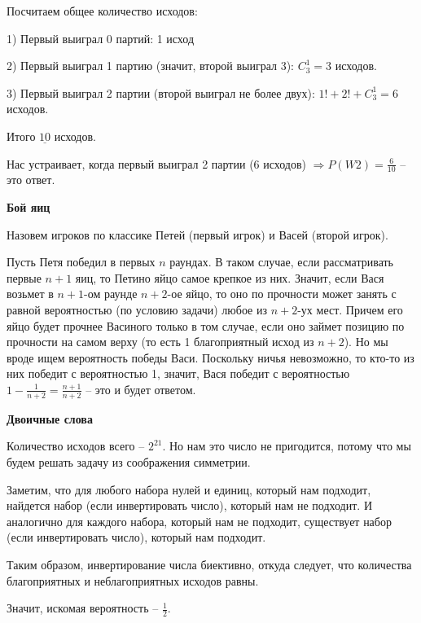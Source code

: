 \documentclass[12pt]{extreport}
\theoremstyle{definiton}
\theoremstyle{definition}
\theoremstyle{definition}
\newcounter{problem}
\newcounter{subproblem}
\def\beforPRskip{
    \bigskip
}
\def\pr{\beforPRskip\noindent\stepcounter{problem}{\bf \theproblem .\;}\setcounter{subproblem}{0}}
\begin{document}
        Посчитаем общее количество исходов:

        1) Первый выиграл 0 партий: 1 исход

        2) Первый выиграл 1 партию (значит, второй выиграл 3): $C_3^1 = 3$ исходов.

        3) Первый выиграл 2 партии (второй выиграл не более двух): $1! + 2! + C_3^1 = 6$ исходов.

        Итого $\underline{10}$ исходов.

        Нас устраивает, когда первый выиграл 2 партии (6 исходов) $\Rightarrow P(W2) = \frac{6}{10}$ -- это ответ.

    \pr \textbf{Бой яиц}

        Назовем игроков по классике Петей (первый игрок) и Васей (второй игрок).

        Пусть Петя победил в первых $n$ раундах. В таком случае, если рассматривать первые $n+1$ яиц, то Петино яйцо самое крепкое из них.
        Значит, если Вася возьмет в $n+1$-ом раунде $n+2$-ое яйцо, то оно по прочности может занять с равной вероятностью (по условию задачи)
        любое из $n+2$-ух мест. Причем его яйцо будет прочнее Васиного только в том случае, если оно займет позицию по прочности на самом верху (то есть 1 благоприятный исход из $n+2$).
        Но мы вроде ищем вероятность победы Васи. Поскольку ничья невозможно, то кто-то из них победит с вероятностью 1, значит,
        Вася победит с вероятностью $1 - \frac{1}{n+2} = \frac{n + 1}{n + 2}$ -- это и будет ответом.

    \pr \textbf{Двоичные слова}

        Количество исходов всего -- $2^21$.
        Но нам это число не пригодится, потому что мы будем решать задачу из соображения симметрии.

        Заметим, что для любого набора нулей и единиц, который нам подходит, найдется набор (если инвертировать число), который нам не подходит.
        И аналогично для каждого набора, который нам не подходит, существует набор (если инвертировать число), который нам подходит.

        Таким образом, инвертирование числа биективно, откуда следует, что количества благоприятных и неблагоприятных исходов равны.

        Значит, искомая вероятность -- $\frac{1}{2}$.
\end{document}
